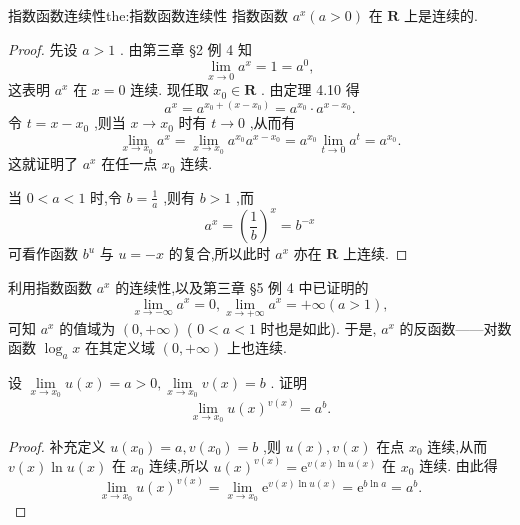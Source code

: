 \begin{theorem}{指数函数连续性}{the:指数函数连续性}
指数函数 \({a}^{x}\left( {a > 0}\right)\) 在 \(\mathbf{R}\) 上是连续的.
\end{theorem}


\begin{proof}
先设 \(a > 1\) . 由第三章 §2 例 4 知
\[
\mathop{\lim }\limits_{{x \rightarrow  0}}{a}^{x} = 1 = {a}^{0},
\]
这表明 \({a}^{x}\) 在 \(x = 0\) 连续. 现任取 \({x}_{0} \in  \mathbf{R}\) . 由定理 4.10 得
\[
{a}^{x} = {a}^{{x}_{0} + \left( {x - {x}_{0}}\right) } = {a}^{{x}_{0}} \cdot  {a}^{x - {x}_{0}}.
\]
令 \(t = x - {x}_{0}\) ,则当 \(x \rightarrow  {x}_{0}\) 时有 \(t \rightarrow  0\) ,从而有
\[
\mathop{\lim }\limits_{{x \rightarrow  {x}_{0}}}{a}^{x} = \mathop{\lim }\limits_{{x \rightarrow  {x}_{0}}}{a}^{{x}_{0}}{a}^{x - {x}_{0}} = {a}^{{x}_{0}}\mathop{\lim }\limits_{{t \rightarrow  0}}{a}^{t} = {a}^{{x}_{0}}.
\]
这就证明了 \({a}^{x}\) 在任一点 \({x}_{0}\) 连续.

当 \(0 < a < 1\) 时,令 \(b = \frac{1}{a}\) ,则有 \(b > 1\) ,而
\[
{a}^{x} = {\left( \frac{1}{b}\right) }^{x} = {b}^{-x}
\]
可看作函数 \({b}^{u}\) 与 \(u =  - x\) 的复合,所以此时 \({a}^{x}\) 亦在 \(\mathbf{R}\) 上连续.
\end{proof}


利用指数函数 \({a}^{x}\) 的连续性,以及第三章 §5 例 4 中已证明的
\[
\mathop{\lim }\limits_{{x \rightarrow   - \infty }}{a}^{x} = 0,\mathop{\lim }\limits_{{x \rightarrow   + \infty }}{a}^{x} =  + \infty \left( {a > 1}\right) ,
\]
可知 \({a}^{x}\) 的值域为 \(\left( {0, + \infty }\right)\) ( \(0 < a < 1\) 时也是如此). 于是, \({a}^{x}\) 的反函数——对数函数 \({\log }_{a}x\) 在其定义域 \(\left( {0, + \infty }\right)\) 上也连续.

\begin{example}
设 \(\mathop{\lim }\limits_{{x \rightarrow  {x}_{0}}}u\left( x\right)  = a > 0,\mathop{\lim }\limits_{{x \rightarrow  {x}_{0}}}v\left( x\right)  = b\) . 证明
\[
\mathop{\lim }\limits_{{x \rightarrow  {x}_{0}}}u{\left( x\right) }^{v\left( x\right) } = {a}^{b}.
\]
\end{example}

\begin{proof}
补充定义 \(u\left( {x}_{0}\right)  = a,v\left( {x}_{0}\right)  = b\) ,则 \(u\left( x\right) ,v\left( x\right)\) 在点 \({x}_{0}\) 连续,从而 \(v\left( x\right) \ln u\left( x\right)\) 在 \({x}_{0}\) 连续,所以 \(u{\left( x\right) }^{v\left( x\right) } = {\mathrm{e}}^{v\left( x\right) \ln u\left( x\right) }\) 在 \({x}_{0}\) 连续. 由此得
\[
\mathop{\lim }\limits_{{x \rightarrow  {x}_{0}}}u{\left( x\right) }^{v\left( x\right) } = \mathop{\lim }\limits_{{x \rightarrow  {x}_{0}}}{\mathrm{e}}^{v\left( x\right) \ln u\left( x\right) } = {\mathrm{e}}^{b\ln a} = {a}^{b}.
\]
\end{proof}

